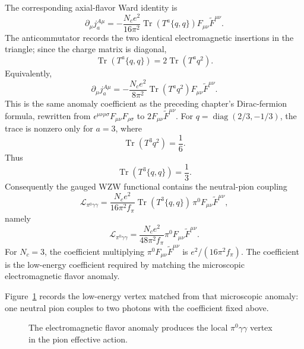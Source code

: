 \begin{remark}
\label{rem:electromagnetic-anomaly-specialization}
The corresponding axial-flavor Ward identity is
\[
  \partial_\mu j_a^{A\mu}
  =
  -\frac{N_c e^2}{16\pi^2}
  \operatorname{Tr}\!\left(T^a\{q,q\}\right)
  F_{\mu\nu}\widetilde F^{\mu\nu}.
\]
The anticommutator records the two identical electromagnetic insertions in the
triangle; since the charge matrix is diagonal,
\[
  \operatorname{Tr}\!\left(T^a\{q,q\}\right)
  =
  2\operatorname{Tr}\!\left(T^a q^2\right).
\]
Equivalently,
\[
  \partial_\mu j_a^{A\mu}
  =
  -\frac{N_c e^2}{8\pi^2}
  \operatorname{Tr}\!\left(T^a q^2\right)
  F_{\mu\nu}\widetilde F^{\mu\nu}.
\]
This is the same anomaly coefficient as the preceding chapter's
Dirac-fermion formula, rewritten from
\(\epsilon^{\mu\nu\rho\sigma}F_{\mu\nu}F_{\rho\sigma}\) to
\(2F_{\mu\nu}\widetilde F^{\mu\nu}\).
For \(q=\operatorname{diag}(2/3,-1/3)\), the trace is nonzero only for
\(a=3\), where
\[
  \operatorname{Tr}\!\left(T^3 q^2\right)=\frac16.
\]
Thus
\[
  \operatorname{Tr}\!\left(T^3\{q,q\}\right)=\frac13 .
\]
Consequently
the gauged WZW functional contains the neutral-pion coupling
\begin{equation}
  \mathcal L_{\pi^0\gamma\gamma}
  =
  \frac{N_c e^2}{16\pi^2 f_\pi}
  \operatorname{Tr}\!\left(T^3\{q,q\}\right)\,
  \pi^0 F_{\mu\nu}\widetilde F^{\mu\nu},
  \label{eq:pi-zero-two-photon-anomaly}
\end{equation}
namely
\[
  \mathcal L_{\pi^0\gamma\gamma}
  =
  \frac{N_c e^2}{48\pi^2 f_\pi}
  \pi^0 F_{\mu\nu}\widetilde F^{\mu\nu}.
\]
For \(N_c=3\), the coefficient multiplying
\(\pi^0F_{\mu\nu}\widetilde F^{\mu\nu}\) is \(e^2/(16\pi^2f_\pi)\).
The coefficient is the low-energy coefficient required by matching the
microscopic electromagnetic flavor anomaly.
\end{remark}

Figure~\ref{fig:pi-zero-two-photon-decay} records the low-energy vertex matched
from that microscopic anomaly: one neutral pion couples to two photons with the
coefficient fixed above.

\begin{figure}[H]
  \centering
  \caption{The electromagnetic flavor anomaly produces the local
  \(\pi^0\gamma\gamma\) vertex in the pion effective action.}
  \label{fig:pi-zero-two-photon-decay}
\end{figure}

